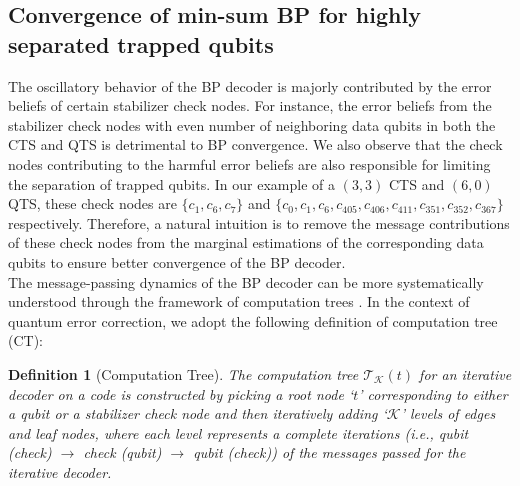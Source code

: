 \documentclass[%
 reprint,
 amsmath,amssymb,
 aps,
pra,
showkeys,
]{revtex4-2}
\newtheorem{definition}{Definition}[section]
\begin{document}
\subsection{Convergence of min-sum BP for highly separated trapped qubits}
The oscillatory behavior of the BP decoder is majorly contributed by the error beliefs of certain stabilizer check nodes.
For instance, the error beliefs from the stabilizer check nodes with even number of neighboring data qubits in both the CTS and QTS is detrimental to BP convergence.
We also observe that the check nodes contributing to the harmful error beliefs are also responsible for limiting the separation of trapped qubits.
In our example of a $(3,3)$ CTS and $(6,0)$ QTS, these check nodes are $\{c_1, c_6, c_7\}$ and $\{c_0, c_1, c_6, c_{405}, c_{406}, c_{411}, c_{351}, c_{352}, c_{367}\}$ respectively.
Therefore, a natural intuition is to remove the message contributions of these check nodes from the marginal estimations of the corresponding data qubits to ensure better convergence of the BP decoder.\\
The message-passing dynamics of the BP decoder can be more systematically understood through the framework of computation trees \cite{frey2001signal,wiberg1996codes}.
In the context of quantum error correction, we adopt the following definition of computation tree (CT):
\begin{definition}[Computation Tree]
    \label{def:cmputation-tree}
    The computation tree $\mathcal{T}_\mathcal{K}(t)$ for an iterative decoder on a code is constructed by picking a root node `$t$' corresponding to either a qubit or a stabilizer check node and then iteratively adding `$\mathcal{K}$' levels of edges and leaf nodes, where each level represents a complete iterations (i.e., qubit (check) $\rightarrow$ check (qubit) $\rightarrow$ qubit (check)) of the messages passed for the iterative decoder.
\end{definition}
\end{document}
